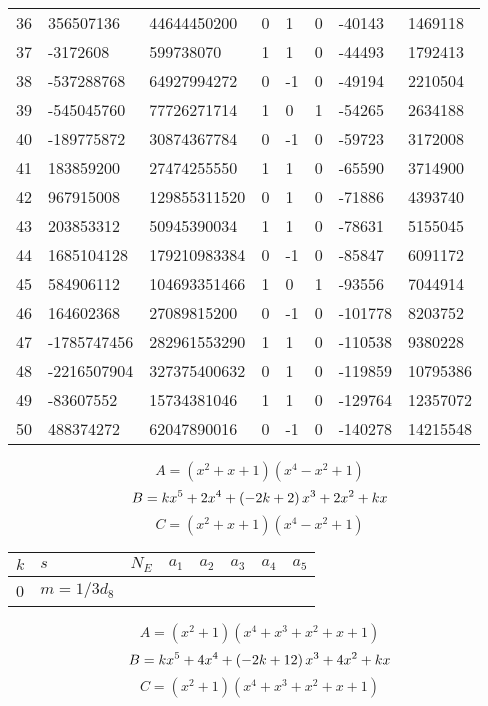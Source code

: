 \documentclass{amsart}
\begin{document}
\begin{longtable}{|l|l|l|lllll|}
36&356507136&44644450200&0&1&0&-40143&1469118\\
37&-3172608&599738070&1&1&0&-44493&1792413\\
38&-537288768&64927994272&0&-1&0&-49194&2210504\\
39&-545045760&77726271714&1&0&1&-54265&2634188\\
40&-189775872&30874367784&0&-1&0&-59723&3172008\\
41&183859200&27474255550&1&1&0&-65590&3714900\\
42&967915008&129855311520&0&1&0&-71886&4393740\\
43&203853312&50945390034&1&1&0&-78631&5155045\\
44&1685104128&179210983384&0&-1&0&-85847&6091172\\
45&584906112&104693351466&1&0&1&-93556&7044914\\
46&164602368&27089815200&0&-1&0&-101778&8203752\\
47&-1785747456&282961553290&1&1&0&-110538&9380228\\
48&-2216507904&327375400632&0&1&0&-119859&10795386\\
49&-83607552&15734381046&1&1&0&-129764&12357072\\
50&488374272&62047890016&0&-1&0&-140278&14215548\\
\hline
\end{longtable}
$$A=(x^2
 + x
 + 1)(x^4
 - x^2
 + 1)$$
$$B=k\*x^5
 + 2\*x^4
 + \left(-2\*k
 + 2\right) \*x^3
 + 2\*x^2
 + k\*x$$
$$C=(x^2
 + x
 + 1)(x^4
 - x^2
 + 1)$$
\begin{longtable}{|l|l|l|lllll|}
\hline
$k$ & $s$ & $N_E$ & $a_1$ & $a_2$ & $a_3$ & $a_4$ & $a_5$\\
\hline
0&$m=1/3d_{8}$&&\multicolumn{5}{c|}{}\\
\hline
\end{longtable}
$$A=(x^2
 + 1)(x^4
 + x^3
 + x^2
 + x
 + 1)$$
$$B=k\*x^5
 + 4\*x^4
 + \left(-2\*k
 + 12\right) \*x^3
 + 4\*x^2
 + k\*x$$
$$C=(x^2
 + 1)(x^4
 + x^3
 + x^2
 + x
 + 1)$$
\end{document}
